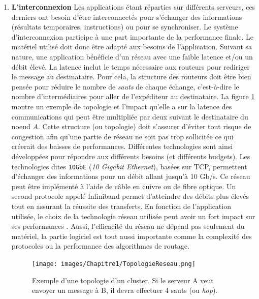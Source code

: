 \begin{enumerate}
            \item \textbf{L'interconnexion}\label{sec:edl_interco} Les applications étant réparties sur différents serveurs, ces derniers ont besoin d'être interconnectés pour s'échanger des informations (résultats temporaires, instructions) ou pour se synchroniser. Le système d'interconnexion participe à une part importante de la performance finale. Le matériel utilisé doit donc être adapté aux besoins de l'application. Suivant sa nature, une application bénéficie d'un réseau avec une faible latence et/ou un débit élevé.
            La latence inclut le temps nécessaire aux routeurs pour rediriger le message au destinataire. Pour cela, la structure des routeurs doit être bien pensée pour réduire le nombre de \textit{sauts} de chaque échange, c'est-à-dire le nombre d'intermédiaires pour aller de l'expéditeur au destinataire. La figure \ref{pic_topologie} montre un exemple de topologie et l'impact qu'elle a sur la latence des communications qui peut être multipliée par deux suivant le destinataire du noeud $A$. Cette structure (ou topologie) doit s'assurer d'éviter tout risque de congestion afin qu'une partie de réseau ne soit pas trop sollicitée ce qui créerait des baisses de performances.    
            Différentes technologies sont ainsi développées pour répondre aux différents besoins (et différents budgets). Les technologies dites \verb|10GbE| (\textit{10 Gigabit Ethernet}), basées sur TCP, permettent d'échanger des informations pour un débit allant jusqu'à 10 Gb/s. Ce réseau peut être implémenté à l'aide de câble en cuivre ou de fibre optique. Un second protocole appelé Infiniband permet d'atteindre des débits plus élevés tout en assurant la réussite des transferts. En fonction de l'application utilisée, le choix de la technologie réseau utilisée peut avoir un fort impact sur ses performances \cite{Council2009}.
                Aussi, l'efficacité du réseau ne dépend pas seulement du matériel, la partie logiciel est tout aussi importante comme la complexité des protocoles ou la performance des algorithmes de routage.
                
                    \begin{figure}
                    \center
                    \texttt{[image: images/Chapitre1/TopologieReseau.png]}
                    \caption{\label{pic_topologie} Exemple d'une topologie d'un cluster. Si le serveur A veut envoyer un message à B, il devra effectuer 4 sauts (ou \textit{hop}).}
                    \end{figure}
          

\end{enumerate}
